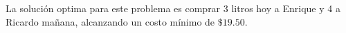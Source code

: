 
\begin{homeworkProblem}
La solución optima para este problema es comprar 3 litros hoy a Enrique y 4 a Ricardo mañana, alcanzando un costo mínimo de $\$19.50$.
\end{homeworkProblem}


